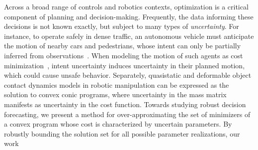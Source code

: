 \documentclass[letterpaper, 10 pt, conference]{ieeeconf}
\newcommand{\?}{\stackrel{?}{=}}
\newcommand{\antoine}[1]{{\textcolor[rgb]{1,0,0}{\textsf{[Antoine: {#1}]}}}}
\begin{document}
Across a broad range of controls and robotics contexts, optimization is a critical component of planning and decision-making.
Frequently, the data informing these decisions is not known exactly, but subject to many types of \emph{uncertainty}.
For instance, to operate safely in dense traffic, an autonomous vehicle must anticipate the motion of nearby cars and pedestrians, whose intent
can only be partially inferred from observations~\cite{englert2017inverse, Peters2023OnlineandOfflineLearningofPlayerObjectivesfromPartialObservationsinDynamicGames}.
When modeling the motion of such agents as cost minimization~\cite{englert2017inverse, Menner2021ConstrainedInverseOptimalControlWithApplicationtoaHumanManipulationTask}, intent uncertainty induces uncertainty in their planned motion, which could cause unsafe behavior.
Separately, quasistatic \cite{li2026certified} and deformable object \cite{li2025convex} contact dynamics models in robotic manipulation can be expressed as the solution to convex conic programs, where uncertainty in the mass matrix manifests as uncertainty in the cost function.
Towards studying robust decision forecasting,
we present a method for over-approximating the set of minimizers of a convex program whose cost is characterized by uncertain parameters.
By robustly bounding the solution set for 
all possible parameter realizations,
our work 
\end{document}
